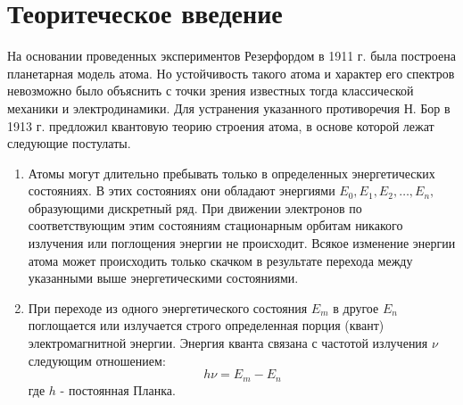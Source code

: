 
\usepackage{xcolor}
\usepackage{float}
\usepackage{hyperref}


\sloppy
\def\authors{Есюнин М.В., Есюнин Д.В.}
\def\sciadviser{Пикулин В.Д.}
\def\labname{Опыт Франка-Герца}
\renewcommand{\contentsname}{Оглавление}
\renewcommand{\figurename}{Рис.}
\renewcommand{\vec}{\mathbf}
\renewcommand{\phi}{\varphi}
\renewcommand{\kappa}{\varkappa}
\renewcommand{\Re}{\operatorname{Re}}
\renewcommand{\Im}{\operatorname{Im}}


\begin{spacing}{1.2}
	\tableofcontents
\end{spacing}
\newpage
\section{Теоритеческое введение}
На основании проведенных экспериментов Резерфордом в 1911 г. была построена планетарная модель атома. Но устойчивость такого атома и характер его спектров невозможно было объяснить с точки зрения известных тогда классической механики и электродинамики. Для устранения указанного противоречия Н. Бор в 1913 г. предложил квантовую теорию строения атома, в основе которой лежат следующие постулаты.
\begin{enumerate}
\item {Атомы могут длительно пребывать только в определенных энергетических состояниях. В этих состояниях они обладают энергиями $E_0,E_1,E_2,\ldots,E_n,$ образующими дискретный ряд. При движении электронов по соответствующим этим состояниям стационарным орбитам никакого излучения или поглощения энергии не происходит. Всякое изменение энергии атома может происходить только скачком в результате перехода между указанными выше энергетическими состояниями.
}
\item {При переходе из одного энергетического состояния $E_m$ в другое $E_n$ поглощается или излучается строго определенная порция (квант) электромагнитной энергии. Энергия кванта связана с частотой излучения $\nu$ следующим отношением:
\begin{equation*}
	h\nu = E_m-E_n
\end{equation*}
где $h$ - постоянная Планка.
}
\end{enumerate}

